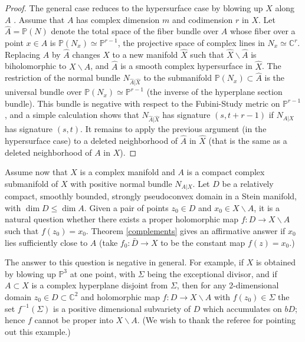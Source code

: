 \documentclass[11pt]{amsart}
\numberwithin{equation}{section}
\theoremstyle{definition}
\begin{document}
\begin{proof}
The general case reduces to the hypersurface case by 
blowing up $X$ along $A$ \cite[\S 3]{Schneider}. 
Assume that $A$ has complex dimension $m$ and codimension $r$ in $X$.
Let $\hat A={\mathbb{P}}(N)$ denote the total space of the fiber bundle over $A$ whose fiber
over a point $x \in A$ is ${\mathbb{P}}(N_x)\simeq {\mathbb{P}}^{r-1}$, 
the projective space of complex lines in 
$N_x\simeq{\mathbb{C}}^r$. Replacing $A$ by $\hat A$ changes $X$ 
to a new manifold $\hat X$ such that $\hat X{\backslash} \hat A$ is biholomorphic 
to $X{\backslash} A$, and $\hat A$ is a smooth complex hypersurface in $\hat X$.
The restriction of the normal bundle $N_{\hat A|\hat X}$ 
to the submanifold ${\mathbb{P}}(N_x)\subset \hat A$ 
is the universal bundle over ${\mathbb{P}}(N_x)\simeq {\mathbb{P}}^{r-1}$ 
(the inverse of the hyperplane section bundle).
This bundle is negative with respect to the 
Fubini-Study metric on ${\mathbb{P}}^{r-1}$, and a simple calculation shows 
that $N_{\hat A|\hat X}$ has signature $(s,t+r-1)$ if
$N_{A|X}$ has signature $(s,t)$. It remains to apply the previous argument 
(in the hypersurface case) to a deleted neighborhood 
of $\hat A$ in $\hat X$ (that is the same as 
a deleted neighborhood of $A$ in $X$).
\end{proof}    

Assume now that $X$ is a complex manifold and $A$  
is a compact complex submanifold of $X$ with positive normal bundle 
$N_{A|X}$. Let $D$ be a relatively compact, 
smoothly bounded, strongly pseudoconvex domain 
in a Stein manifold, with $\dim D \le \dim A$.
Given a pair of points $z_0\in D$ and $x_0 \in X{\backslash} A$, 
it is a natural question whether there exists a proper holomorphic map 
$f\colon D\to X{\backslash} A$ such that $f(z_0)=x_0$.
Theorem \ref{complements} gives an affirmative answer
if $x_0$ lies sufficiently close to $A$ (take $f_0\colon \bar D\to X$ 
to be the constant map $f(z)=x_0$.) 

The answer to this question is negative in general. 
For example, if $X$ is obtained by
blowing up ${\mathbb{P}}^3$ at one point, with $\Sigma$ being the exceptional
divisor, and if $A\subset X$ is a complex hyperplane disjoint from $\Sigma$,
then for any 2-dimensional domain $z_0\in D\subset {\mathbb{C}}^2$ 
and holomorphic map $f\colon D\to X{\backslash} A$ with $f(z_0)\in \Sigma$
the set $f^{-1}(\Sigma)$ is a positive dimensional subvariety
of $D$ which accumulates on $bD$; hence $f$ cannot be
proper into $X{\backslash} A$. (We wish to thank the referee 
for pointing out this example.)
\end{document}
